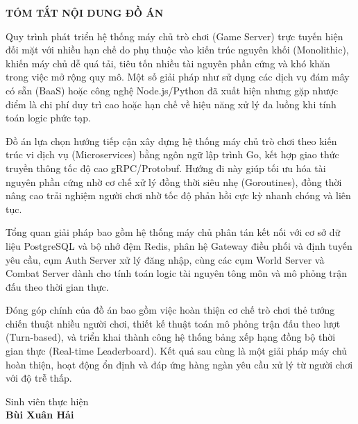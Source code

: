 \documentclass[../Project.tex]{subfiles}
\begin{document}
\begin{center}
    \Large{\textbf{TÓM TẮT NỘI DUNG ĐỒ ÁN}}\\
\end{center}
\vspace{0.5cm}

Quy trình phát triển hệ thống máy chủ trò chơi (Game Server) trực tuyến hiện đối mặt với nhiều hạn chế do phụ thuộc vào kiến trúc nguyên khối (Monolithic), khiến máy chủ dễ quá tải, tiêu tốn nhiều tài nguyên phần cứng và khó khăn trong việc mở rộng quy mô. Một số giải pháp như sử dụng các dịch vụ đám mây có sẵn (BaaS) hoặc công nghệ Node.js/Python đã xuất hiện nhưng gặp nhược điểm là chi phí duy trì cao hoặc hạn chế về hiệu năng xử lý đa luồng khi tính toán logic phức tạp.

Đồ án lựa chọn hướng tiếp cận xây dựng hệ thống máy chủ trò chơi theo kiến trúc vi dịch vụ (Microservices) bằng ngôn ngữ lập trình Go, kết hợp giao thức truyền thông tốc độ cao gRPC/Protobuf. Hướng đi này giúp tối ưu hóa tài nguyên phần cứng nhờ cơ chế xử lý đồng thời siêu nhẹ (Goroutines), đồng thời nâng cao trải nghiệm người chơi nhờ tốc độ phản hồi cực kỳ nhanh chóng và liên tục.

Tổng quan giải pháp bao gồm hệ thống máy chủ phân tán kết nối với cơ sở dữ liệu PostgreSQL và bộ nhớ đệm Redis, phân hệ Gateway điều phối và định tuyến yêu cầu, cụm Auth Server xử lý đăng nhập, cùng các cụm World Server và Combat Server dành cho tính toán logic tài nguyên tông môn và mô phỏng trận đấu theo thời gian thực.

Đóng góp chính của đồ án bao gồm việc hoàn thiện cơ chế trò chơi thẻ tướng chiến thuật nhiều người chơi, thiết kế thuật toán mô phỏng trận đấu theo lượt (Turn-based), và triển khai thành công hệ thống bảng xếp hạng đồng bộ thời gian thực (Real-time Leaderboard). Kết quả sau cùng là một giải pháp máy chủ hoàn thiện, hoạt động ổn định và đáp ứng hàng ngàn yêu cầu xử lý từ người chơi với độ trễ thấp.

\vspace{1cm}
\begin{flushright}
Sinh viên thực hiện\\[0.5cm]
\textbf{Bùi Xuân Hải}
\end{flushright}
\end{document}
